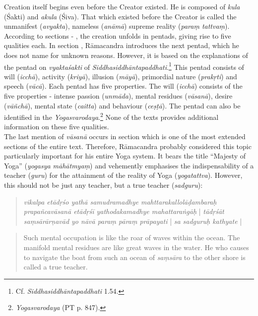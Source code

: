 Creation itself begins even before the Creator existed. He is composed of \textit{kula} (Śakti) and \textit{akula} (Śiva). That which existed before the Creator is called the unmanifest (\textit{avyakta}), nameless (\textit{anāmā}) supreme reality (\textit{paraṃ tattvaṃ}). According to sections  - , the creation unfolds in pentads, giving rise to five qualities each. In section , Rāmacandra introduces the next pentad, which he does not name for unknown reasons. However, it is based on the explanations of the pentad on \textit{vyaktaśakti} of \textit{Siddhasiddhāntapaddhati}.\footnote{Cf. \textit{Siddhasiddhāntapaddhati} 1.54.} This pentad consists of will (\textit{icchā}), activity (\textit{kriyā}), illusion (\textit{māyā}), primordial nature (\textit{prakṛti}) and speech (\textit{vācā}). Each pentad has five properties. The will (\textit{icchā}) consists of the five properties - intense passion (\textit{unmāda}), mental residues (\textit{vāsanā}), desire (\textit{vāñchā}), mental state (\textit{caitta}) and behaviour (\textit{ceṣṭā}). The pentad can also be identified in the \textit{Yogasvarodaya}.\footnote{\textit{Yogasvarodaya} (PT p. 847).} None of the texts provides additional information on these five qualities. \\

  The last mention of \textit{vāsanā} occurs in section  which is one of the most extended sections of the entire text. Therefore, Rāmacandra probably considered this topic particularly important for his entire Yoga system. It bears the title ``Majesty of Yoga'' (\textit{yogasya māhātmyaṃ}) and vehemently emphasises the indispensability of a teacher (\textit{guru}) for the attainment of the reality of Yoga (\textit{yogatattva}). However, this should not be just any teacher, but a true teacher (\textit{sadguru}):
  \begin{quote}
    \textit{vikalpa etādṛśo yathā samudramadhye mahttarakallolāḍambaraḥ prapañcavāsanā etādṛśī yathodakamadhye mahattaraṅgāḥ} | \textit{tādṛśāt saṃsārārṇavād yo nāvā paraṃ pāraṃ prāpayati} | \textit{sa sadguruḥ kathyate} |
    \end{quote}
  \begin{quote}
   Such mental occupation is like the roar of waves within the ocean. The manifold mental residues are like great waves in the water. He who causes to navigate the boat from such an ocean of \textit{saṃsāra} to the other shore is called a true teacher.
  \end{quote}

